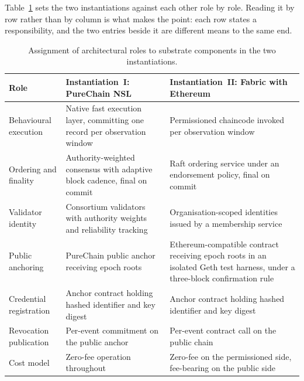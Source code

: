 Table~\ref{tab:substrate-mapping} sets the two instantiations against each other role by role. Reading it by row rather than by column is what makes the point: each row states a responsibility, and the two entries beside it are different means to the same end.

\begin{table}[!htbp]
  \centering
  \footnotesize
  \setlength{\tabcolsep}{5pt}
  \renewcommand{\arraystretch}{1.3}
  \caption{Assignment of architectural roles to substrate components in the two instantiations.}
  \label{tab:substrate-mapping}
  \begin{tabularx}{\textwidth}{@{}
      >{\raggedright\arraybackslash}p{3.2cm}
      >{\raggedright\arraybackslash}X
      >{\raggedright\arraybackslash}X@{}}
    \toprule
    \textbf{Role} & \textbf{Instantiation~I: PureChain NSL} & \textbf{Instantiation~II: Fabric with Ethereum} \\
    \midrule
    Behavioural execution
      & Native fast execution layer, committing one record per observation window
      & Permissioned chaincode invoked per observation window \\
    Ordering and finality
      & Authority-weighted consensus with adaptive block cadence, final on commit
      & Raft ordering service under an endorsement policy, final on commit \\
    Validator identity
      & Consortium validators with authority weights and reliability tracking
      & Organisation-scoped identities issued by a membership service \\
    Public anchoring
      & PureChain public anchor receiving epoch roots
      & Ethereum-compatible contract receiving epoch roots in an isolated Geth test harness, under a three-block confirmation rule \\
    Credential registration
      & Anchor contract holding hashed identifier and key digest
      & Anchor contract holding hashed identifier and key digest \\
    Revocation publication
      & Per-event commitment on the public anchor
      & Per-event contract call on the public chain \\
    Cost model
      & Zero-fee operation throughout
      & Zero-fee on the permissioned side, fee-bearing on the public side \\
    \bottomrule
  \end{tabularx}
\end{table}

